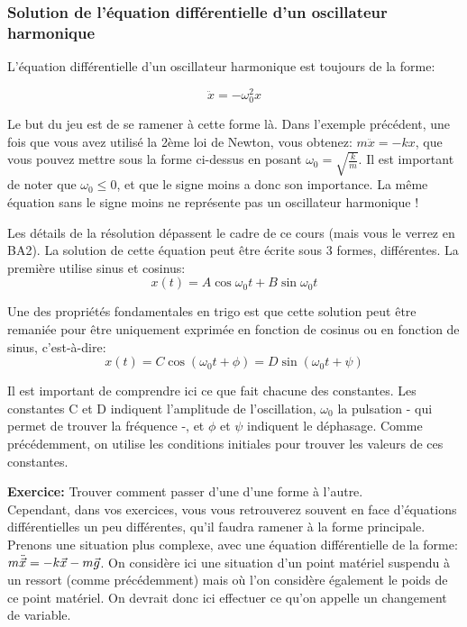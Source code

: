 \documentclass{article}
\begin{document}
\subsubsection{Solution de l'équation différentielle d'un oscillateur harmonique}

L'équation différentielle d'un oscillateur harmonique est toujours de la forme:

\[  \ddot x  =  -\omega_0^2x \]

Le but du jeu est de se ramener à cette forme là. Dans l'exemple précédent, une fois que vous avez utilisé la 2ème loi de Newton, vous obtenez: $m \ddot{x} = -kx$, que vous pouvez mettre sous la forme ci-dessus en posant $\omega_0 = \sqrt{\frac{k}{m}}$. Il est important de noter que $\omega_0 \leq 0$, et que le signe moins a donc son importance. La même équation sans le signe moins ne représente pas un oscillateur harmonique !

Les détails de la résolution dépassent le cadre de ce cours (mais vous le verrez en BA2). La solution de cette équation peut être écrite sous 3 formes, différentes. La première utilise sinus et cosinus:  \[ x(t) = A\cos{\omega_0 t} + B \sin{\omega_0 t} \]

Une des propriétés fondamentales en trigo est que cette solution peut être remaniée pour être uniquement exprimée en fonction de cosinus ou en fonction de sinus, c'est-à-dire: 
\[ x(t) = C \cos{(\omega_0 t + \phi)} = D \sin{(\omega_0 t + \psi)} \] 

Il est important de comprendre ici ce que fait chacune des constantes. Les constantes C et D indiquent l'amplitude de l'oscillation, $\omega_0$ la pulsation - qui permet de trouver la fréquence -, et $\phi$ et $\psi$ indiquent le déphasage. Comme précédemment, on utilise les conditions initiales pour trouver les valeurs de ces constantes.

\noindent\textbf{Exercice: } Trouver comment passer d'une d'une forme à l'autre. \\

\noindent Cependant, dans vos exercices, vous vous retrouverez souvent en face d'équations différentielles un peu différentes, qu'il faudra ramener à la forme principale. Prenons une situation plus complexe, avec une équation différentielle de la forme: $m \Ddot{\vec {x}} = -k\vec{x} - m \vec{g}$. On considère ici une situation d'un point matériel suspendu à un ressort (comme précédemment) mais où l'on considère également le poids de ce point matériel. On devrait donc ici effectuer ce qu'on appelle un changement de variable.
\end{document}
